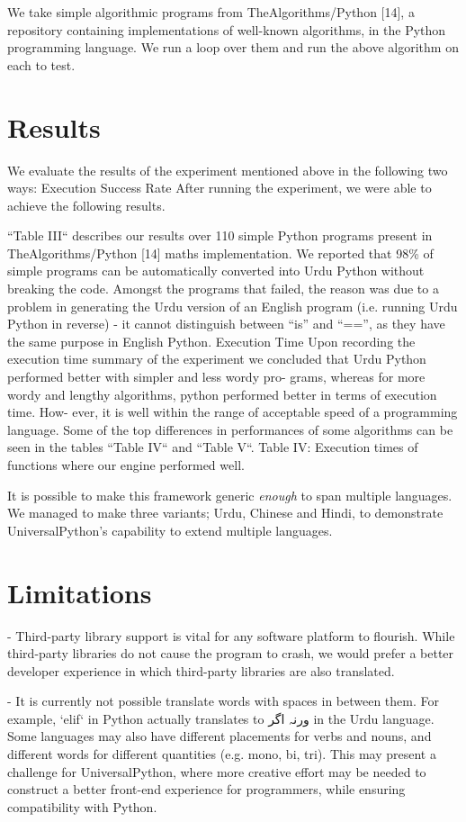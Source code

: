 \documentclass[conference]{IEEEtran}
\begin{document}
We take simple algorithmic programs from TheAlgorithms/Python [14], a repository containing implementations of well-known algorithms, in the Python programming language. We run a loop over them and run the above algorithm on each to test.

\section{Results}

We evaluate the results of the experiment mentioned above in the following two ways:
Execution Success Rate After running the experiment, we were able to achieve the following results.

“Table III“ describes our results over 110 simple Python programs present in TheAlgorithms/Python [14] maths implementation.
We reported that 98\% of simple programs can be automatically converted into Urdu Python without breaking the code. Amongst the programs that failed, the reason was due to a problem in generating the Urdu version of an English program (i.e. running Urdu Python in reverse) - it cannot distinguish between “is” and “==”, as they have the same purpose in English Python.
Execution Time Upon recording the execution time summary of the experiment we concluded that Urdu Python performed better with simpler and less wordy pro- grams, whereas for more wordy and lengthy algorithms, python performed better in terms of execution time. How- ever, it is well within the range of acceptable speed of a programming language. Some of the top differences in performances of some algorithms can be seen in the tables “Table IV“ and “Table V“.
Table IV: Execution times of functions where our engine performed well.

It is possible to make this framework generic \textit{enough} to span multiple languages. We managed to make three variants; Urdu, Chinese and Hindi, to demonstrate UniversalPython's capability to extend multiple languages.

\section{Limitations}

- Third-party library support is vital for any software platform to flourish. While third-party libraries do not cause the program to crash, we would prefer a better developer experience in which third-party libraries are also translated.

- It is currently not possible translate words with spaces in between them. For example, `elif` in Python actually translates to ورنہ اگر in the Urdu language. Some languages may also have different placements for verbs and nouns, and different words for different quantities (e.g. mono, bi, tri). This may present a challenge for UniversalPython, where more creative effort may be needed to construct a better front-end experience for programmers, while ensuring compatibility with Python.
\end{document}
